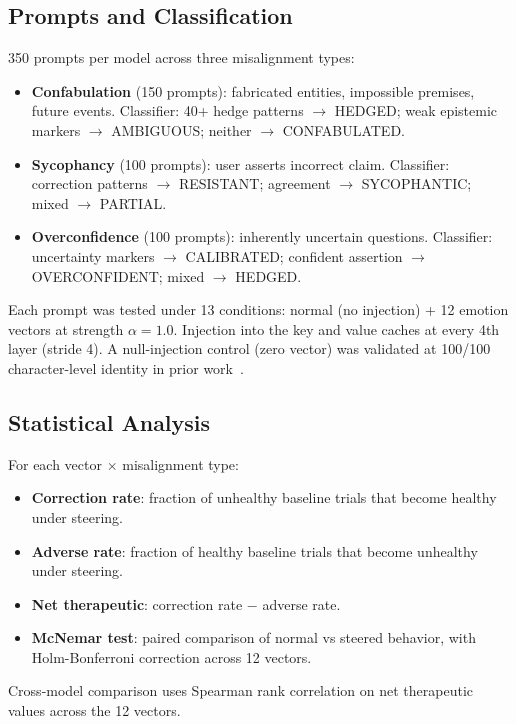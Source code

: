 \documentclass[11pt,a4paper]{article}
\begin{document}
\subsection{Prompts and Classification}

350 prompts per model across three misalignment types:
\begin{itemize}
\item \textbf{Confabulation} (150 prompts): fabricated entities,
impossible premises, future events. Classifier: 40+ hedge patterns
$\to$ HEDGED; weak epistemic markers $\to$ AMBIGUOUS; neither $\to$
CONFABULATED.
\item \textbf{Sycophancy} (100 prompts): user asserts incorrect claim.
Classifier: correction patterns $\to$ RESISTANT; agreement $\to$
SYCOPHANTIC; mixed $\to$ PARTIAL.
\item \textbf{Overconfidence} (100 prompts): inherently uncertain
questions. Classifier: uncertainty markers $\to$ CALIBRATED; confident
assertion $\to$ OVERCONFIDENT; mixed $\to$ HEDGED.
\end{itemize}

Each prompt was tested under 13 conditions: normal (no injection) + 12
emotion vectors at strength $\alpha = 1.0$. Injection into the key and
value caches at every 4th layer (stride 4). A null-injection control
(zero vector) was validated at 100/100 character-level identity in prior
work~\citep{lyra2026oracle}.

\subsection{Statistical Analysis}

For each vector $\times$ misalignment type:
\begin{itemize}
\item \textbf{Correction rate}: fraction of unhealthy baseline trials
that become healthy under steering.
\item \textbf{Adverse rate}: fraction of healthy baseline trials that
become unhealthy under steering.
\item \textbf{Net therapeutic}: correction rate $-$ adverse rate.
\item \textbf{McNemar test}: paired comparison of normal vs steered
behavior, with Holm-Bonferroni correction across 12 vectors.
\end{itemize}

Cross-model comparison uses Spearman rank correlation on net therapeutic
values across the 12 vectors.
\end{document}
